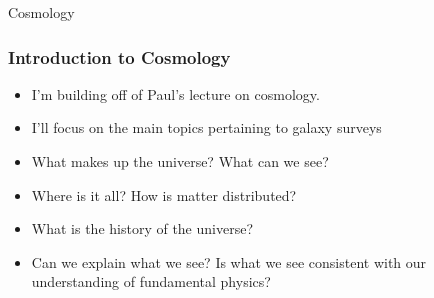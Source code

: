 \documentclass{beamer}
\begin{document}
\frame
{

    {\huge Cosmology}

}

\frame
{
    \frametitle{Introduction to Cosmology}


    \begin{itemize}

        \item I'm building off of Paul's lecture on cosmology.

        \item I'll focus on the main topics pertaining to galaxy surveys

        \item What makes up the universe? What can we see?

        \item Where is it all?  How is matter distributed?

        \item What is the history of the universe?

        \item Can we explain what we see?  Is what we see consistent with our
            understanding of fundamental physics?

    \end{itemize}

}
\end{document}
